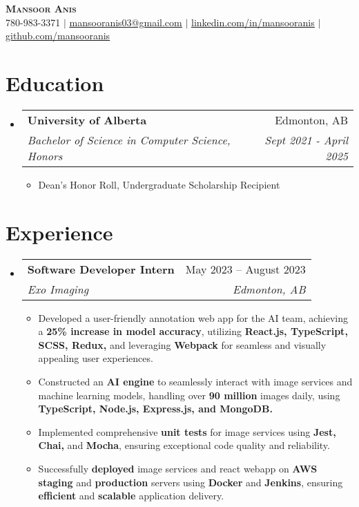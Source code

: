 \documentclass[letterpaper,11pt]{article}
\makeatletter
\newcommand{\resumeItem}[1]{
  \item\small{
    {#1 \vspace{-2pt}}
  }
}
\newcommand{\resumeSubheading}[4]{
  \vspace{-2pt}\item
    \begin{tabular*}{0.97\textwidth}[t]{l@{\extracolsep{\fill}}r}
      \textbf{#1} & #2 \\
      \textit{\small#3} & \textit{\small #4} \\
    \end{tabular*}\vspace{-7pt}
}
\newcommand{\resumeSubHeadingListStart}{\begin{itemize}[leftmargin=0.15in, label={}]}
\newcommand{\resumeSubHeadingListEnd}{\end{itemize}}
\newcommand{\resumeItemListStart}{\begin{itemize}}
\newcommand{\resumeItemListEnd}{\end{itemize}\vspace{-5pt}}
\makeatother
\begin{document}
\begin{center}
    \textbf{\Huge \scshape Mansoor Anis} \\ \vspace{1pt}
    \small 780-983-3371 $|$ \href{mailto:mansooranis03@gmail.com}{\underline{mansooranis03@gmail.com}} $|$ 
    \href{https://linkedin.com/in/mansooranis}{\underline{linkedin.com/in/mansooranis}} $|$
    \href{https://github.com/mansooranis}{\underline{github.com/mansooranis}}
\end{center}


\section{Education}
  \resumeSubHeadingListStart
    \resumeSubheading
      {University of Alberta}{Edmonton, AB}
      {Bachelor of Science in Computer Science, Honors}{Sept 2021 - April 2025}
      \resumeItemListStart
        \resumeItem{Dean's Honor Roll, Undergraduate Scholarship Recipient}
      \resumeItemListEnd
  \resumeSubHeadingListEnd


\section{Experience}
  \resumeSubHeadingListStart

    \resumeSubheading
      {Software Developer Intern}{May 2023 -- August 2023}
      {Exo Imaging}{Edmonton, AB}
      \resumeItemListStart
        \resumeItem{Developed a user-friendly annotation web app for the AI team, achieving a \textbf{25\% increase in model accuracy}, utilizing \textbf{React.js, TypeScript, SCSS, Redux,} and leveraging \textbf{Webpack} for seamless and visually appealing user experiences.}
        \resumeItem{Constructed an \textbf{AI engine} to seamlessly interact with image services and machine learning models, handling over \textbf{90 million} images daily, using \textbf{TypeScript, Node.js, Express.js, and MongoDB.}}
        \resumeItem{Implemented comprehensive \textbf{unit tests} for image services using \textbf{Jest, Chai,} and \textbf{Mocha}, ensuring exceptional code quality and reliability.}
        \resumeItem{Successfully \textbf{deployed} image services and react webapp on \textbf{AWS staging} and \textbf{production }servers using \textbf{Docker} and \textbf{Jenkins}, ensuring \textbf{efficient} and \textbf{scalable} application delivery.}
    \resumeItemListEnd
  \resumeSubHeadingListEnd
\end{document}
